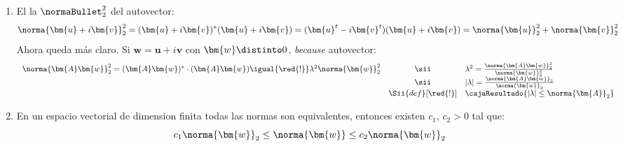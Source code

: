 \begin{enumerate}[label=\alph*)]
  \item El la $\normaBullet_2^2$ del autovector:
        $$
          \norma{\bm{u} + i\bm{v}}_2^2 =
          (\bm{u} + i\bm{v})^*
          (\bm{u} + i\bm{v})=
          (\bm{u}^t - i\bm{v}^t)
          (\bm{u} + i\bm{v}) =
          \norma{\bm{u}}_2^2 + \norma{\bm{v}}_2^2
        $$
        Ahora queda más claro. Si \ul{$\bm{w} = \bm{u} + i\bm{v}$} con $\bm{w} \distinto 0$, \textit{because} autovector:
        $$
          \begin{array}{rcl}
            \norma{\bm{A}\bm{w}}_2^2 =
            (\bm{A}\bm{w})^* \cdot (\bm{A}\bm{w}) \igual{\red{!}}
            \lambda^2 \norma{\bm{w}}_2^2
             & \sii               &
            \lambda^2 = \frac{\norma{\bm{A}\bm{w}}_2^2}{\norma{\bm{w}}_2^2} \\
             & \sii               &
            |\lambda| = \frac{\norma{\bm{A}\bm{w}}_2}{\norma{\bm{w}}_2}     \\
             & \Sii{def}[\red{!}] &
            \cajaResultado{
              |\lambda| \leq \norma{\bm{A}}_2
            }
          \end{array}
        $$

  \item
        En un espacio vectorial de dimension finita todas las normas son equivalentes, entonces existen $c_1,\, c_2 > 0$ tal que:
        $$
          c_1 \norma{\bm{w}}_2
          \leq
          \norma{\bm{w}}
          \leq
          c_2 \norma{\bm{w}}_2
        $$
        \hacer
\end{enumerate}

\begin{aportes}
  \item {}
\end{aportes}
